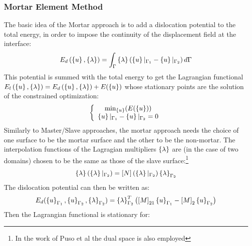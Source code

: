 \subsubsection{Mortar Element Method}\label{sssec341}
The basic idea of the Mortar approach is to add a dislocation potential to the total energy, in order to impose the continuity of the displacement field at the interface:
\begin{equation}
\label{eq.61}
E_d\left( \left\lbrace{u}\right \rbrace, \left\lbrace{\lambda}\right \rbrace \right)=\int_{\Gamma} \left\lbrace{\lambda}\right \rbrace\left(\left\lbrace{u}\right \rbrace|_{\Gamma_1}-\left\lbrace{u}\right \rbrace|_{\Gamma_2}\right)d\Gamma
\end{equation}
This potential is summed with the total energy to get the Lagrangian functional $E_l \left(\left\lbrace{u}\right \rbrace, \left\lbrace{\lambda}\right \rbrace \right)=E_d\left( \left\lbrace{u}\right \rbrace, \left\lbrace{\lambda}\right \rbrace \right)+E(\left\lbrace{u}\right \rbrace)$ whose stationary points are the solution of the constrained optimization:
\begin{equation}
\label{eq.62}
\left\lbrace \begin{array}{c}
\min_{\left\lbrace{u}\right \rbrace}(E(\left\lbrace{u}\right \rbrace))\\
  \left\lbrace{u}\right \rbrace|_{\Gamma_1}-\left\lbrace{u}\right \rbrace|_{\Gamma_2}=0
\end{array}\right.
\end{equation}
Similarly to Master/Slave approaches, the mortar approach needs the choice of one surface to be the mortar surface and the other to be the non-mortar.
The interpolation functions of the Lagragian multipliers $\left\lbrace{\lambda}\right \rbrace$ are (in the case of two domains) chosen to be the same as those of the slave surface:\footnote{In the work of Puso et al \cite{puso20043d} the dual space is also employed}
\begin{equation}
\label{eq.63}
\left\lbrace{\lambda}\right \rbrace(\left\lbrace{\lambda}\right \rbrace|_{\Gamma_2})=\left[{N}\right](\left\lbrace{\lambda}\right \rbrace|_{\Gamma_2})\left\lbrace{\lambda}\right \rbrace_{\Gamma_2}
\end{equation}
The dislocation potential can then be written as:
\begin{equation}
\label{eq.64}
E_d( \left\lbrace{u}\right \rbrace_{\Gamma_1},\left\lbrace{u}\right \rbrace_{\Gamma_2},\left\lbrace{\lambda}\right \rbrace_{\Gamma_2})=\left\lbrace{\lambda}\right \rbrace_{\Gamma_2}^T\left(\left[{M}\right]_{21}\left\lbrace{u}\right \rbrace_{\Gamma_1}-\left[{M}\right]_2\left\lbrace{u}\right \rbrace_{\Gamma_2}\right)
\end{equation}
Then the Lagrangian functional is stationary  for:
